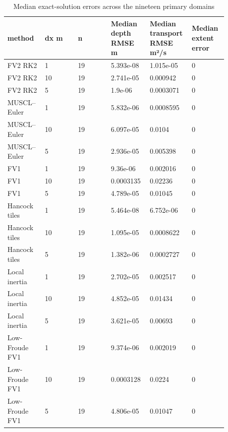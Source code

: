 \begingroup
\small
\setlength{\tabcolsep}{2pt}
\begin{longtable}{p{0.1467\linewidth}p{0.1467\linewidth}p{0.1467\linewidth}p{0.1467\linewidth}p{0.1467\linewidth}p{0.1467\linewidth}}
\caption{Median exact-solution errors across the nineteen primary domains}\\
\hline
method & dx m & n & Median depth RMSE m & Median transport RMSE m²/s & Median extent error \\
\hline\endhead
FV2 RK2 & 1 & 19 & 5.393e-08 & 1.015e-05 & 0 \\
FV2 RK2 & 10 & 19 & 2.741e-05 & 0.000942 & 0 \\
FV2 RK2 & 5 & 19 & 1.9e-06 & 0.0003071 & 0 \\
MUSCL–Euler & 1 & 19 & 5.832e-06 & 0.0008595 & 0 \\
MUSCL–Euler & 10 & 19 & 6.097e-05 & 0.0104 & 0 \\
MUSCL–Euler & 5 & 19 & 2.936e-05 & 0.005398 & 0 \\
FV1 & 1 & 19 & 9.36e-06 & 0.002016 & 0 \\
FV1 & 10 & 19 & 0.0003135 & 0.02236 & 0 \\
FV1 & 5 & 19 & 4.789e-05 & 0.01045 & 0 \\
Hancock tiles & 1 & 19 & 5.464e-08 & 6.752e-06 & 0 \\
Hancock tiles & 10 & 19 & 1.095e-05 & 0.0008622 & 0 \\
Hancock tiles & 5 & 19 & 1.382e-06 & 0.0002727 & 0 \\
Local inertia & 1 & 19 & 2.702e-05 & 0.002517 & 0 \\
Local inertia & 10 & 19 & 4.852e-05 & 0.01434 & 0 \\
Local inertia & 5 & 19 & 3.621e-05 & 0.00693 & 0 \\
Low-Froude FV1 & 1 & 19 & 9.374e-06 & 0.002019 & 0 \\
Low-Froude FV1 & 10 & 19 & 0.0003128 & 0.0224 & 0 \\
Low-Froude FV1 & 5 & 19 & 4.806e-05 & 0.01047 & 0 \\
\end{longtable}
\endgroup
